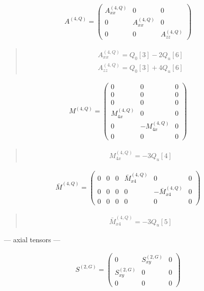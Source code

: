 \documentclass[fleqn,10pt]{jsarticle}
\begin{document}
\begin{align*}
A^{(4,Q)} = \begin{pmatrix} A^{(4,Q)}_{xx} & 0 & 0 \\ 0 & A^{(4,Q)}_{xx} & 0 \\ 0 & 0 & A^{(4,Q)}_{zz} \end{pmatrix}
\end{align*}
\begin{quote}
\begin{align*}
& A^{(4,Q)}_{xx} = Q_{0}[3] - 2 Q_{u}[6] \\
& A^{(4,Q)}_{zz} = Q_{0}[3] + 4 Q_{u}[6]
\end{align*}
\end{quote}
\begin{align*}
M^{(4,Q)} = \begin{pmatrix} 0 & 0 & 0 \\ 0 & 0 & 0 \\ 0 & 0 & 0 \\ M^{(4,Q)}_{4x} & 0 & 0 \\ 0 & - M^{(4,Q)}_{4x} & 0 \\ 0 & 0 & 0 \end{pmatrix}
\end{align*}
\begin{quote}
\begin{align*}
& M^{(4,Q)}_{4x} = - 3 Q_{u}[4]
\end{align*}
\end{quote}
\begin{align*}
\bar{M}^{(4,Q)} = \begin{pmatrix} 0 & 0 & 0 & \bar{M}^{(4,Q)}_{x4} & 0 & 0 \\ 0 & 0 & 0 & 0 & - \bar{M}^{(4,Q)}_{x4} & 0 \\ 0 & 0 & 0 & 0 & 0 & 0 \end{pmatrix}
\end{align*}
\begin{quote}
\begin{align*}
& \bar{M}^{(4,Q)}_{x4} = - 3 Q_{u}[5]
\end{align*}
\end{quote}
\newpage
\begin{center}\LARGE --- axial tensors ---\end{center}
\begin{align*}
S^{(2,G)} = \begin{pmatrix} 0 & S^{(2,G)}_{xy} & 0 \\ S^{(2,G)}_{xy} & 0 & 0 \\ 0 & 0 & 0 \end{pmatrix}
\end{align*}
\end{document}
